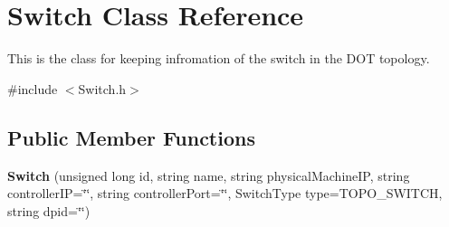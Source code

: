 \hypertarget{classSwitch}{\section{\-Switch \-Class \-Reference}
\label{classSwitch}
}


\-This is the class for keeping infromation of the switch in the \-D\-O\-T topology.  




{\ttfamily \#include $<$\-Switch.\-h$>$}

\subsection*{\-Public \-Member \-Functions}
\begin{DoxyCompactItemize}
\item 
\hypertarget{classSwitch_a123ff2a9ea3f7b58a255edeca601f491}{{\bfseries \-Switch} (unsigned long id, string name, string physical\-Machine\-I\-P, string controller\-I\-P=\char`\"{}\char`\"{}, string controller\-Port=\char`\"{}\char`\"{}, \-Switch\-Type type=\-T\-O\-P\-O\-\_\-\-S\-W\-I\-T\-C\-H, string dpid=\char`\"{}\char`\"{})}\label{classSwitch_a123ff2a9ea3f7b58a255edeca601f491}


\end{DoxyCompactItemize}
